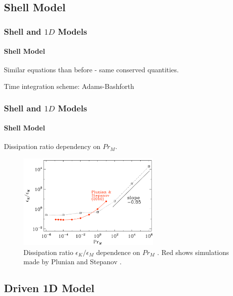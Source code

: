\documentclass{beamer}
\begin{document}
\subsection{Shell Model}

\begin{frame}
 \frametitle{Shell and $1D$ Models}
 \framesubtitle{Shell Model}
 
 Similar equations than before - same conserved quantities.
 
 Time integration scheme: Adams-Bashforth
\end{frame}

\begin{frame}
 \frametitle{Shell and $1D$ Models}
 \framesubtitle{Shell Model}
 
 Dissipation ratio dependency on $Pr_M$.
 
 \begin{figure}[t]
  \includegraphics[width=7cm]{img/dissipation_ratio2}
  \caption{Dissipation ratio $\epsilon_K/\epsilon_M$ dependence on $Pr_M$ \cite{brandenburg2014magnetic}. Red shows simulations made by Plunian and Stepanov \cite{plunian2010cascades}.}
  \centering
 \end{figure}
 
\end{frame}

\subsection{Driven 1D Model}
\end{document}
